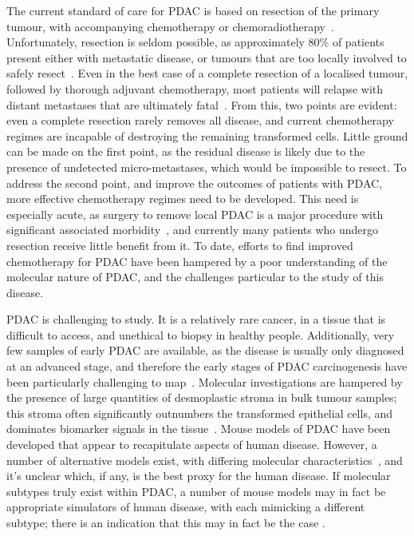 \documentclass[thesis.tex]{subfiles}
\begin{document}
The current standard of care for \gls{PDAC} is based on resection of the primary tumour, with accompanying chemotherapy or chemoradiotherapy~\cite{Editors2015}.  Unfortunately, resection is seldom possible, as approximately $80\%$ of patients present either with metastatic disease, or tumours that are too locally involved to safely resect~\cite{Ryan2014}.  Even in the best case of a complete resection of a localised tumour, followed by thorough adjuvant chemotherapy, most patients will relapse with distant metastases that are ultimately fatal~\cite{Barugola2007}.  From this, two points are evident: even a complete resection rarely removes all disease, and current chemotherapy regimes are incapable of destroying the remaining transformed cells.  Little ground can be made on the first point, as the residual disease is likely due to the presence of undetected micro-metastases, which would be impossible to resect.  To address the second point, and improve the outcomes of patients with \gls{PDAC}, more effective chemotherapy regimes need to be developed.  This need is especially acute, as surgery to remove local \gls{PDAC} is a major procedure with significant associated morbidity~\cite{Ho2005}, and currently many patients who undergo resection receive little benefit from it.  To date, efforts to find improved chemotherapy for \gls{PDAC} have been hampered by a poor understanding of the molecular nature of \gls{PDAC}, and the challenges particular to the study of this disease.

\gls{PDAC} is challenging to study.  It is a relatively rare cancer, in a tissue that is difficult to access, and unethical to biopsy in healthy people.  Additionally, very few samples of early \gls{PDAC} are available, as the disease is usually only diagnosed at an advanced stage, and therefore the early stages of \gls{PDAC} carcinogenesis have been particularly challenging to map~\cite{Hruban2000}.  Molecular investigations are hampered by the presence of large quantities of desmoplastic stroma in bulk tumour samples; this stroma often significantly outnumbers the transformed epithelial cells, and dominates biomarker signals in the tissue~\cite{Collisson2011}.  Mouse models of \gls{PDAC} have been developed that appear to recapitulate aspects of human disease.  However, a number of alternative models exist, with differing molecular characteristics~\cite{Westphalen2012}, and it's unclear which, if any, is the best proxy for the human disease.  If molecular subtypes truly exist within \gls{PDAC}, a number of mouse models may in fact be appropriate simulators of human disease, with each mimicking a different subtype; there is an indication that this may in fact be the case \cite{Collisson2011}.
\end{document}
